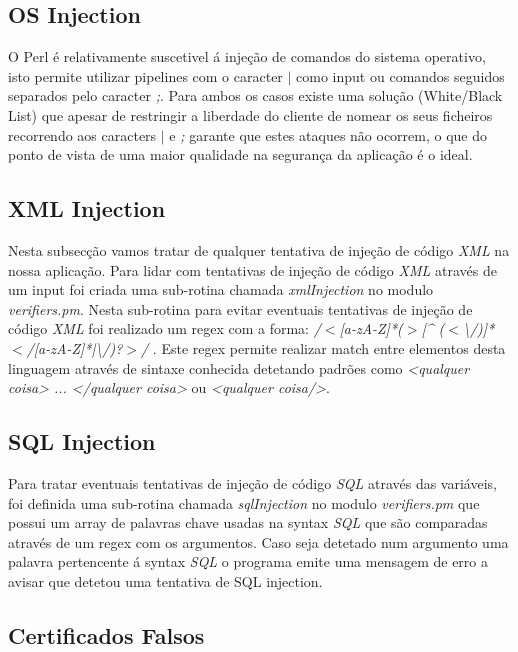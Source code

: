 \subsection{OS Injection}

O Perl é relativamente suscetivel á injeção de comandos do sistema operativo, isto permite utilizar pipelines com o caracter \textit{$\mid$} como input ou comandos seguidos separados pelo caracter \textit{;}. Para ambos os casos existe uma solução (White/Black List) que apesar de restringir a liberdade do cliente de nomear os seus ficheiros recorrendo aos caracters \textit{$\mid$} e \textit{;} garante que estes ataques não ocorrem, o que do ponto de vista de uma maior qualidade na segurança da aplicação é o ideal.


\subsection{XML Injection}

Nesta subsecção vamos tratar de qualquer tentativa de injeção de código \textit{XML} na nossa aplicação.\newline
Para lidar com tentativas de injeção de código \textit{XML} através de um input foi criada uma sub-rotina chamada \textit{xmlInjection} no modulo \textit{verifiers.pm}. Nesta sub-rotina para evitar eventuais tentativas de injeção de código \textit{XML} foi realizado um regex com a forma: \textit{/$<$[a-zA-Z]*($>$[\^{} ($<$\textbackslash/)]*$<$/[a-zA-Z]*|\textbackslash/)?$>$/} . \newline
Este regex permite realizar match entre elementos desta linguagem através de sintaxe conhecida detetando padrões como \textit{<qualquer coisa> ... </qualquer coisa>} ou \textit{<qualquer coisa/>}.

\subsection{SQL Injection}

Para tratar eventuais tentativas de injeção de código \textit{SQL} através das variáveis, foi definida uma sub-rotina chamada \textit{sqlInjection} no modulo \textit{verifiers.pm} que possui um array de palavras chave usadas na syntax \textit{SQL} que são comparadas através de um regex com os argumentos. Caso seja detetado num argumento uma palavra pertencente á syntax \textit{SQL} o programa emite uma mensagem de erro a avisar que detetou uma tentativa de SQL injection.

\subsection{Certificados Falsos}

